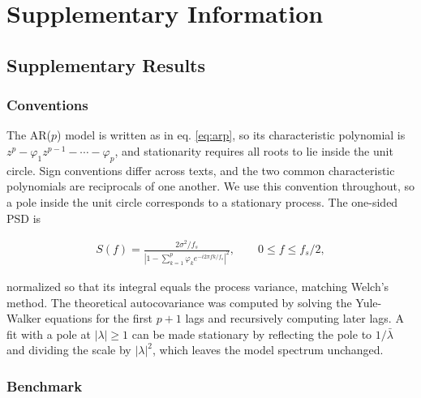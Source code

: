 \documentclass[pdflatex,lineno,sn-nature]{sn-jnl}
\theoremstyle{thmstyleone}
\theoremstyle{thmstyletwo}
\theoremstyle{thmstylethree}
\begin{document}
\backmatter

\clearpage
\section*{Supplementary Information}\label{sec:supp}

\setcounter{figure}{0}
\renewcommand{\thefigure}{S\arabic{figure}}
\setcounter{table}{0}
\renewcommand{\thetable}{S\arabic{table}}
\setcounter{equation}{0}
\renewcommand{\theequation}{S\arabic{equation}}

\subsection*{Supplementary Results}\label{sec:sresults}

\subsubsection*{Conventions}

The AR($p$) model is written as in eq. \ref{eq:arp}, so its characteristic polynomial is $z^p - \varphi_1 z^{p-1} - \cdots - \varphi_p$, and stationarity requires all roots to lie inside the unit circle. Sign conventions differ across texts, and the two common characteristic polynomials are reciprocals of one another. We use this convention throughout, so a pole inside the unit circle corresponds to a stationary process. The one-sided PSD is

\begin{align}
S(f) = \frac{2\sigma^2/f_s}{\left|1 - \sum_{k=1}^{p}\varphi_k e^{-i 2\pi f k/f_s}\right|^{2}}, \qquad 0 \le f \le f_s/2,
\end{align}

normalized so that its integral equals the process variance, matching Welch's method. The theoretical autocovariance was computed by solving the Yule-Walker equations for the first $p+1$ lags and recursively computing later lags. A fit with a pole at $|\lambda| \ge 1$ can be made stationary by reflecting the pole to $1/\bar\lambda$ and dividing the scale by $|\lambda|^2$, which leaves the model spectrum unchanged.

\subsubsection*{Benchmark}
\end{document}
